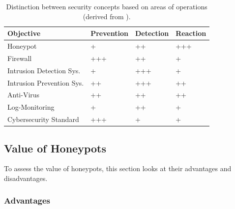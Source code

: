 \begin{table}
    \centering
    \caption[Distinction between security concepts]{
        Distinction between security concepts based on areas of operations (derived from \cite{NawrockiWSKS2016}).
    }
    \begin{tabular}{l|lll}
        \toprule
        \textbf{Objective}        & \textbf{Prevention} & \textbf{Detection} & \textbf{Reaction} \\ \hline
        Honeypot                  & +                   & ++                 & +++               \\
        Firewall                  & +++                 & ++                 & +                 \\
        Intrusion Detection Sys.  & +                   & +++                & +                 \\
        Intrusion Prevention Sys. & ++                  & +++                & ++                \\
        Anti-Virus                & ++                  & ++                 & ++                \\
        Log-Monitoring            & +                   & ++                 & +                 \\
        Cybersecurity Standard    & +++                 & +                  & +                 \\
        \bottomrule
    \end{tabular}
    \label{tab:honeypots-security-concepts}
\end{table}

\subsection{Value of Honeypots}

To assess the value of honeypots, this section looks at their advantages and disadvantages. \cite{Mokube2007,Kaur2014,Spitzner2003}

\subsubsection{Advantages}

